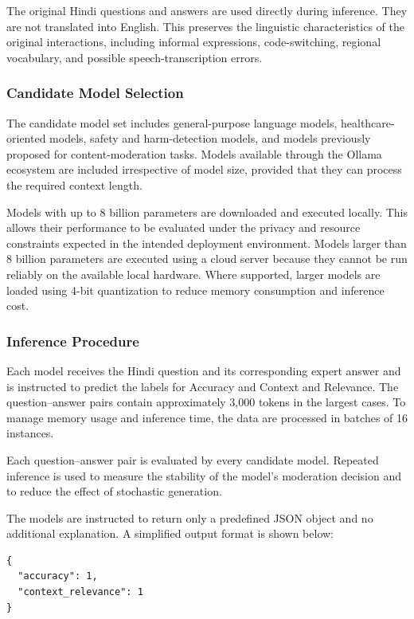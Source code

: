 \documentclass[11pt,a4paper]{article}
\begin{document}
The original Hindi questions and answers are used directly during inference.
They are not translated into English. This preserves the linguistic
characteristics of the original interactions, including informal expressions,
code-switching, regional vocabulary, and possible speech-transcription errors.

\subsubsection{Candidate Model Selection}

The candidate model set includes general-purpose language models,
healthcare-oriented models, safety and harm-detection models, and models
previously proposed for content-moderation tasks. Models available through the
Ollama ecosystem are included irrespective of model size, provided that they
can process the required context length.

Models with up to 8 billion parameters are downloaded and executed locally.
This allows their performance to be evaluated under the privacy and resource
constraints expected in the intended deployment environment. Models larger
than 8 billion parameters are executed using a cloud server because they
cannot be run reliably on the available local hardware. Where supported,
larger models are loaded using 4-bit quantization to reduce memory consumption
and inference cost.

\subsubsection{Inference Procedure}

Each model receives the Hindi question and its corresponding expert answer and
is instructed to predict the labels for Accuracy and Context and Relevance.
The question--answer pairs contain approximately 3,000 tokens in the largest
cases. To manage memory usage and inference time, the data are processed in
batches of 16 instances.

Each question--answer pair is evaluated  by every candidate model.
Repeated inference is used to measure the stability of the model's moderation
decision and to reduce the effect of stochastic generation. 

The models are instructed to return only a predefined JSON object and no
additional explanation. A simplified output format is shown below:

\begin{verbatim}
{
  "accuracy": 1,
  "context_relevance": 1
}
\end{verbatim}
\end{document}
